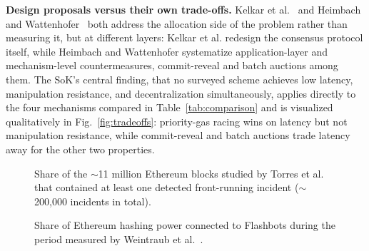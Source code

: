 \documentclass[conference]{IEEEtran}
\begin{document}
\textbf{Design proposals versus their own trade-offs.} Kelkar et
al.~\cite{kelkar2020order} and Heimbach and
Wattenhofer~\cite{heimbach2022sok} both address the allocation side of
the problem rather than measuring it, but at different layers: Kelkar et
al. redesign the consensus protocol itself, while Heimbach and
Wattenhofer systematize application-layer and mechanism-level
countermeasures, commit-reveal and batch auctions among them. The SoK's
central finding, that no surveyed scheme achieves low latency,
manipulation resistance, and decentralization simultaneously, applies
directly to the four mechanisms compared in Table~\ref{tab:comparison}
and is visualized qualitatively in Fig.~\ref{fig:tradeoffs}: priority-gas
racing wins on latency but not manipulation resistance, while
commit-reveal and batch auctions trade latency away for the other two
properties.

\begin{figure}[!t]
\centering
{}
\caption{Share of the $\sim$11 million Ethereum blocks studied by
Torres et al.~\cite{torres2021frontrunner} that contained at least one
detected front-running incident ($\sim$200{,}000 incidents in total).}
\label{fig:torres}
\end{figure}

\begin{figure}[!t]
\centering
{}
\caption{Share of Ethereum hashing power connected to Flashbots during
the period measured by Weintraub et al.~\cite{weintraub2022flashbot}.}
\label{fig:weintraub}
\end{figure}
\end{document}
